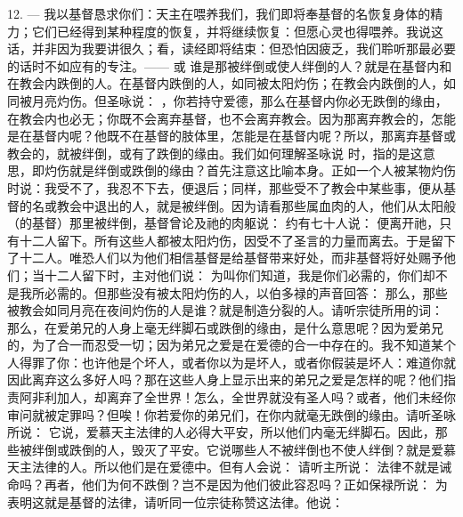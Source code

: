 12.   — 我以基督恳求你们：天主在喂养我们，我们即将奉基督的名恢复身体的精力；它们已经得到某种程度的恢复，并将继续恢复：但愿心灵也得喂养。我说这话，并非因为我要讲很久；看，读经即将结束：但恐怕因疲乏，我们聆听那最必要的话时不如应有的专注。——  或  谁是那被绊倒或使人绊倒的人？就是在基督内和在教会内跌倒的人。在基督内跌倒的人，如同被太阳灼伤；在教会内跌倒的人，如同被月亮灼伤。但圣咏说： ，你若持守爱德，那么在基督内你必无跌倒的缘由，在教会内也必无；你既不会离弃基督，也不会离弃教会。因为那离弃教会的，怎能是在基督内呢？他既不在基督的肢体里，怎能是在基督内呢？所以，那离弃基督或教会的，就被绊倒，或有了跌倒的缘由。我们如何理解圣咏说 时，指的是这意思，即灼伤就是绊倒或跌倒的缘由？首先注意这比喻本身。正如一个人被某物灼伤时说：我受不了，我忍不下去，便退后；同样，那些受不了教会中某些事，便从基督的名或教会中退出的人，就是被绊倒。因为请看那些属血肉的人，他们从太阳般（的基督）那里被绊倒，基督曾论及祂的肉躯说：  约有七十人说： 便离开祂，只有十二人留下。所有这些人都被太阳灼伤，因受不了圣言的力量而离去。于是留下了十二人。唯恐人们以为他们相信基督是给基督带来好处，而非基督将好处赐予他们；当十二人留下时，主对他们说： 为叫你们知道，我是你们必需的，你们却不是我所必需的。但那些没有被太阳灼伤的人，以伯多禄的声音回答： 那么，那些被教会如同月亮在夜间灼伤的人是谁？就是制造分裂的人。请听宗徒所用的词：  那么，在爱弟兄的人身上毫无绊脚石或跌倒的缘由，是什么意思呢？因为爱弟兄的，为了合一而忍受一切；因为弟兄之爱是在爱德的合一中存在的。我不知道某个人得罪了你：也许他是个坏人，或者你以为是坏人，或者你假装是坏人：难道你就因此离弃这么多好人吗？那在这些人身上显示出来的弟兄之爱是怎样的呢？他们指责阿非利加人，却离弃了全世界！怎么，全世界就没有圣人吗？或者，他们未经你审问就被定罪吗？但唉！你若爱你的弟兄们，在你内就毫无跌倒的缘由。请听圣咏所说： 它说，爱慕天主法律的人必得大平安，所以他们内毫无绊脚石。因此，那些被绊倒或跌倒的人，毁灭了平安。它说哪些人不被绊倒也不使人绊倒？就是爱慕天主法律的人。所以他们是在爱德中。但有人会说： 请听主所说：  法律不就是诫命吗？再者，他们为何不跌倒？岂不是因为他们彼此容忍吗？正如保禄所说：  为表明这就是基督的法律，请听同一位宗徒称赞这法律。他说：  \par

